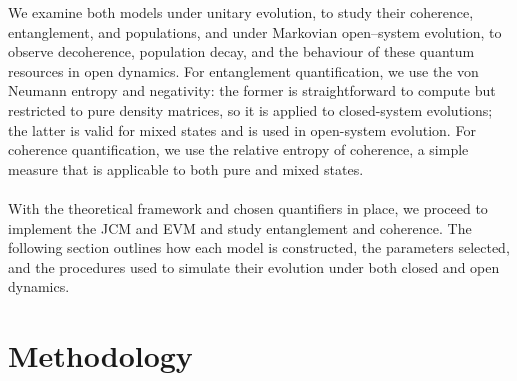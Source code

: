 \documentclass[12pt]{article}
\begin{document}
We examine both models under unitary evolution, to study their coherence, entanglement, and populations, and under Markovian open--system evolution, to observe decoherence, population decay, and the behaviour of these quantum resources in open dynamics. For entanglement quantification, we use the von Neumann entropy and negativity: the former is straightforward to compute but restricted to pure density matrices, so it is applied to closed-system evolutions; the latter is valid for mixed states and is used in open-system evolution. For coherence quantification, we use the relative entropy of coherence, a simple measure that is applicable to both pure and mixed states.\\
\\
With the theoretical framework and chosen quantifiers in place, we proceed to implement the JCM and EVM and study entanglement and coherence. The following section outlines how each model is constructed, the parameters selected, and the procedures used to simulate their evolution under both closed and open dynamics. 
\newpage
\section{Methodology} \label{sec:method}
\end{document}
